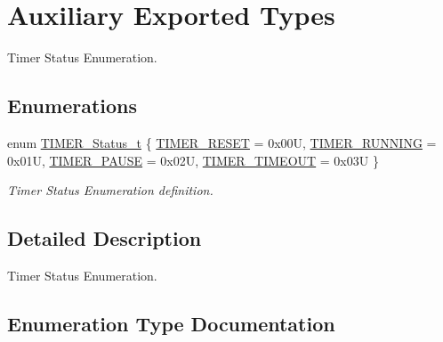 \hypertarget{group___k_n_x___aux___exported___types}{}\section{Auxiliary Exported Types}
\label{group___k_n_x___aux___exported___types}


Timer Status Enumeration.  


\subsection*{Enumerations}
\begin{DoxyCompactItemize}
\item 
enum \hyperlink{group___k_n_x___aux___exported___types_ga6ed3d972c6c5995cb3fe41995f121b41}{T\+I\+M\+E\+R\+\_\+\+Status\+\_\+t} \{ \hyperlink{group___k_n_x___aux___exported___types_gga6ed3d972c6c5995cb3fe41995f121b41a57568fa3e509d45656007614c72089ae}{T\+I\+M\+E\+R\+\_\+\+R\+E\+S\+ET} = 0x00U, 
\hyperlink{group___k_n_x___aux___exported___types_gga6ed3d972c6c5995cb3fe41995f121b41abc4495967cdeae935ea31fa8c3992139}{T\+I\+M\+E\+R\+\_\+\+R\+U\+N\+N\+I\+NG} = 0x01U, 
\hyperlink{group___k_n_x___aux___exported___types_gga6ed3d972c6c5995cb3fe41995f121b41a2fc9fdb3e346a94262fa0e143f8fcb79}{T\+I\+M\+E\+R\+\_\+\+P\+A\+U\+SE} = 0x02U, 
\hyperlink{group___k_n_x___aux___exported___types_gga6ed3d972c6c5995cb3fe41995f121b41ac6e6a01a6b4fad4c8054e0065442bdf7}{T\+I\+M\+E\+R\+\_\+\+T\+I\+M\+E\+O\+UT} = 0x03U
 \}\begin{DoxyCompactList}\small\item\em Timer Status Enumeration definition. \end{DoxyCompactList}
\end{DoxyCompactItemize}


\subsection{Detailed Description}
Timer Status Enumeration. 



\subsection{Enumeration Type Documentation}
